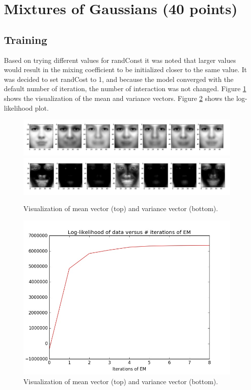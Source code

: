 \documentclass[12pt]{article}
\begin{document}
\section{Mixtures of Gaussians (40 points)}

\setcounter{subsection}{1}
\subsection{Training}

Based on trying different values for randConst it was noted that larger values would result in the mixing coefficient to be initialized closer to the same value. It was decided to set randCost to 1, and because the model converged with the default number of iteration, the number of interaction was not changed. Figure \ref{f42a} shows the visualization of the mean and variance vectors. Figure \ref{f42b} shows the log-likelihood plot. 

\begin{figure}[!htb]
\centering
\includegraphics[width=0.6\linewidth]{42/1mean.jpg}
\includegraphics[width=0.6\linewidth]{42/1var.jpg}

\vspace{-0.1in}
\caption{Visualization of mean vector (top) and variance vector (bottom).}
\label{f42a}
\vspace{-0.1in}
\end{figure}

\begin{figure}[!htb]
\centering
\includegraphics[width=0.6\linewidth]{42/1like.jpg}
\vspace{-0.1in}
\caption{Visualization of mean vector (top) and variance vector (bottom).}
\label{f42b}
\vspace{-0.1in}
\end{figure}
\end{document}
